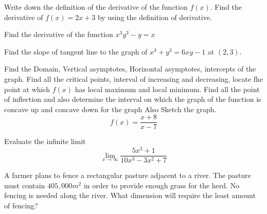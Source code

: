 \documentclass[11pt]{exam}
\begin{document}
\begin{questions}

\vspace{3cm}

\addpoints
\question[6] Write down the definition of the derivative of the function $f(x)$. Find the derivative of $f(x)=2x+3$ by using the definition of derivative. 

\newpage
\addpoints
\question[4] Find the derivative of the function $x^3y^3-y=x$

\vspace{8cm}
\addpoints
\question[4] Find the slope of tangent line to the graph of $x^3+y^3=6xy-1$ at $(2,3)$.




\newpage
\addpoints
\question[10] Find the Domain, Vertical asymptotes, Horizontal asymptotes, intercepts of the graph. Find all the critical points, interval of increasing and decreasing, locate fhe point at which $f(x)$ has local maximum and local minimum. Find all the point of inflection and also determine the interval on which the graph of the function is concave up and concave down for the graph Also Sketch the graph. \[f(x)=\frac{x+8}{x-7}\]





\newpage
\addpoints
\question[4] Evaluate the infinite limit
\[ \lim\limits_{x\to \infty} \frac{5x^3+1}{10x^3-3x^2+7} \]






\vspace{8cm}
\addpoints
\question[4]A farmer plans to fence a rectangular pasture adjacent to a river. The pasture must contain $405,000 m^2$ in order to provide enough grass for the herd. No fencing is needed along the river. What dimension will require the least amount of fencing?







\end{questions}
\end{document}
